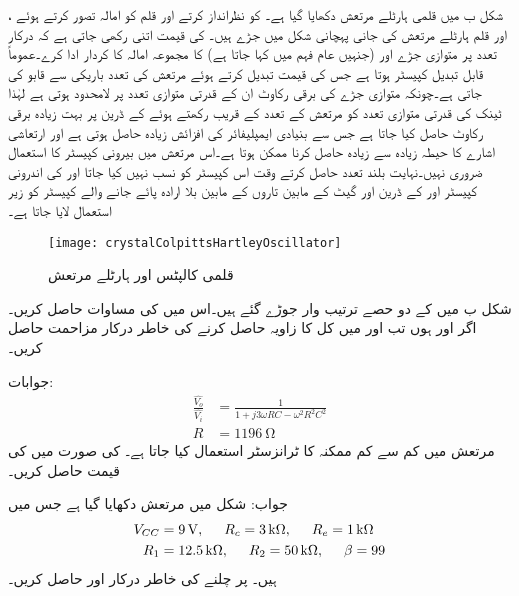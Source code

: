 شکل  ب میں قلمی ہارٹلے مرتعش دکھایا گیا ہے۔ کو نظرانداز کرتے اور قلم کو امالہ تصور کرتے ہوئے  ،  اور قلم  ہارٹلے مرتعش کی جانی پہچانی شکل میں جڑے ہیں۔ کی قیمت اتنی رکھی جاتی ہے کہ درکار تعدد پر متوازی جڑے  اور  (جنہیں عام فہم میں   کہا جاتا ہے) کا مجموعہ امالہ کا کردار ادا کرے۔عموماً  قابل تبدیل کپیسٹر ہوتا ہے جس کی قیمت تبدیل کرتے ہوئے  مرتعش کی تعدد باریکی سے قابو کی جاتی ہے۔چونکہ متوازی جڑے  کی برقی رکاوٹ ان کے قدرتی متوازی تعدد پر لامحدود ہوتی ہے لہٰذا  ٹینک کی قدرتی متوازی تعدد کو مرتعش کے تعدد کے قریب رکھتے ہوئے   کے ڈرین پر بہت زیادہ برقی رکاوٹ حاصل کیا جاتا ہے جس سے  بنیادی ایمپلیفائر کی افزائش زیادہ حاصل ہوتی ہے اور ارتعاشی اشارے کا حیطہ زیادہ سے زیادہ حاصل کرنا ممکن ہوتا ہے۔اس مرتعش میں بیرونی کپیسٹر  کا استعمال ضروری نہیں۔نہایت بلند تعدد حاصل کرتے وقت اس کپیسٹر کو نسب نہیں کیا جاتا اور  کی اندرونی کپیسٹر  اور  کے ڈرین اور گیٹ کے مابین تاروں کے  مابین  بلا ارادہ پائے جانے والے کپیسٹر کو زیر استعمال لایا جاتا ہے۔
\begin{figure}
\centering
\texttt{[image: crystalColpittsHartleyOscillator]}
\caption{قلمی کالپٹس اور ہارٹلے مرتعش}
\label{شکل_کالپٹس_ہارٹلے_مرتعش_قلمی}
\end{figure}
\newpage
{}

شکل  ب میں  کے دو حصے ترتیب وار جوڑے گئے ہیں۔اس میں   کی مساوات حاصل کریں۔اگر   اور  ہوں تب  اور  میں کل  کا زاویہ حاصل کرنے کی خاطر درکار مزاحمت حاصل کریں۔

جوابات:
\begin{align*}
\frac{\hat{V_o}}{\hat{V_i}}&=\frac{1}{1+j 3 \omega R C -\omega^2 R^2 C^2}\\
R&=\SI{1196}{\ohm}
\end{align*}
 مرتعش میں کم سے کم ممکنہ  کا ٹرانزسٹر استعمال کیا جاتا ہے۔ کی صورت میں  کی قیمت حاصل کریں۔

جواب:
شکل  میں  مرتعش دکھایا گیا ہے جس میں
\begin{align*}
V_{CC}&=\SI{9}{\volt}, \hspace{5mm} R_c=\SI{3}{\kilo \ohm}, \hspace{5mm} R_e=\SI{1}{\kilo \ohm}\\
R_1&=\SI{12.5}{\kilo \ohm}, \hspace{5mm} R_2=\SI{50}{\kilo \ohm}, \hspace{5mm} \beta=99
\end{align*}
ہیں۔ پر چلنے کی خاطر درکار  اور  حاصل کریں۔


